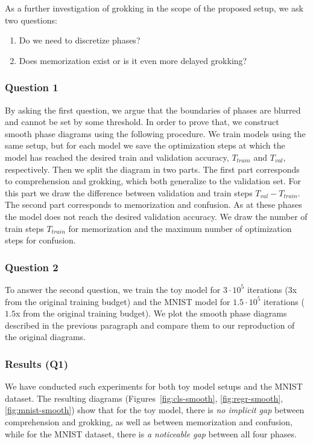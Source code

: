 As a further investigation of grokking in the scope of the proposed setup, we ask two questions:
\begin{enumerate}
\item Do we need to discretize phases?
\item Does memorization exist or is it even more delayed grokking?
\end{enumerate}

\subsubsection{Question 1}\label{sec:question_1}
By asking the first question, we argue that the boundaries of phases are blurred and cannot be set by some threshold. In order to prove that, we construct smooth phase diagrams using the following procedure. We train models using the same setup, but for each model we save the optimization steps at which the model has reached the desired train and validation accuracy, $T_{train}$ and $T_{val}$, respectively. Then we split the diagram in two parts. The first part corresponds to comprehension and grokking, which both generalize to the validation set. For this part we draw the difference between validation and train steps $T_{val} - T_{train}$. The second part corresponds to memorization and confusion. As at these phases the model does not reach the desired validation accuracy. We draw the number of train steps $T_{train}$ for memorization and the maximum number of optimization steps for confusion.

\subsubsection{Question 2}\label{sec:question_2}
To answer the second question, we train the toy model for $3 \cdot 10^5$ iterations ($3$x from the original training budget) and the MNIST model for $1.5 \cdot 10^5$ iterations ($1.5$x from the original training budget). We plot the smooth phase diagrams described in the previous paragraph and compare them to our reproduction of the original diagrams.

\subsubsection{Results (Q1)}
We have conducted such experiments for both toy model setups and the MNIST dataset. The resulting diagrams (Figures~\ref{fig:cls-smooth}, \ref{fig:regr-smooth}, \ref{fig:mnist-smooth}) show that for the toy model, there is \emph{no implicit gap} between comprehension and grokking, as well as between memorization and confusion, while for the MNIST dataset, there is \emph{a noticeable gap} between all four phases.

